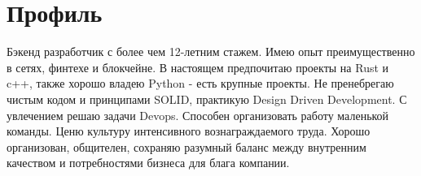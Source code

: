 \documentclass[letterpaper,11pt]{article}
\begin{document}
  
\section{Профиль}
\vspace{3pt}
\justifying
\setlength{\parindent}{10pt}

Бэкенд разработчик с более чем 12-летним стажем. Имею опыт преимущественно в сетях, финтехе и блокчейне. В настоящем предпочитаю проекты на Rust и c++, также хорошо владею Python - есть крупные проекты. Не пренебрегаю чистым кодом и принципами SOLID, практикую Design Driven Development. С увлечением решаю задачи Devops. Способен организовать работу маленькой команды. Ценю культуру интенсивного вознаграждаемого труда. Хорошо организован, общителен, сохраняю разумный баланс между внутренним качеством и потребностями бизнеса для блага компании.

\end{document}

